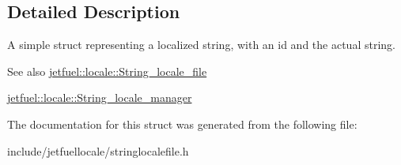 \subsection{Detailed Description}
A simple struct representing a localized string, with an id and the actual string.

\begin{DoxySeeAlso}{See also}
\hyperlink{classjetfuel_1_1locale_1_1String__locale__file}{jetfuel\+::locale\+::\+String\+\_\+locale\+\_\+file} 

\hyperlink{classjetfuel_1_1locale_1_1String__locale__manager}{jetfuel\+::locale\+::\+String\+\_\+locale\+\_\+manager} 
\end{DoxySeeAlso}


The documentation for this struct was generated from the following file\+:\begin{DoxyCompactItemize}
\item 
include/jetfuellocale/stringlocalefile.\+h\end{DoxyCompactItemize}
